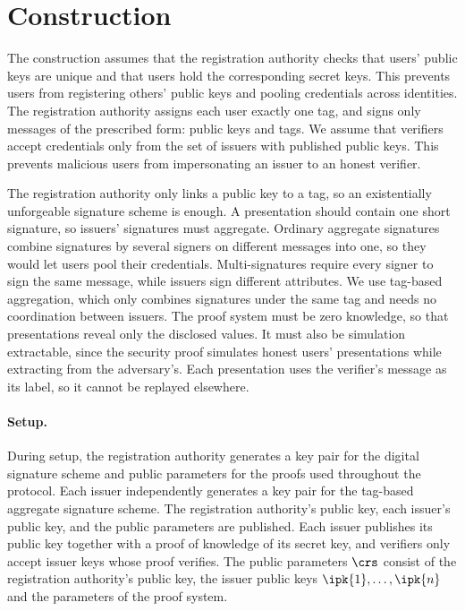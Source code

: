 \section{Construction}\label{sec:agg-creds-construction}

The construction assumes that the registration authority checks that users'
public keys are unique and that users hold the corresponding secret keys.
This prevents users from registering others' public keys and pooling credentials
across identities.  The registration authority assigns each user exactly one
tag, and signs only messages of the prescribed form: public keys and tags. We assume that verifiers
accept credentials only from the set of issuers with published public keys. This
prevents malicious users from impersonating an issuer to an honest
verifier.

The registration authority only links a public key to a tag, so an existentially
unforgeable signature scheme is enough. A presentation should contain one
short signature, so issuers' signatures must aggregate. Ordinary aggregate signatures
combine signatures by several signers on different messages into one, so they
would let users pool their credentials. Multi-signatures require every
signer to sign the same message, while issuers sign different attributes.
We use tag-based aggregation, which only combines signatures under the same tag
and needs no coordination between issuers. The proof system must be zero knowledge, so that presentations
reveal only the disclosed values. It must also be simulation extractable, since
the security proof simulates honest users' presentations while extracting from
the adversary's. Each presentation uses the verifier's message as its label, so
it cannot be replayed elsewhere.

\paragraph{Setup.} During setup, the registration authority generates a key pair
for the digital signature scheme and public parameters for the proofs used
throughout the protocol. Each issuer independently generates a key pair for the
tag-based aggregate signature scheme. The registration authority's public key,
each issuer's public key, and the public parameters are published. Each issuer
publishes its public key together with a proof of knowledge of its secret key,
and verifiers only accept issuer keys whose proof verifies. The public
parameters $\crs$ consist of the registration authority's public key, the issuer
public keys $\ipk{1}, \ldots, \ipk{n}$ and the parameters of the proof system.

